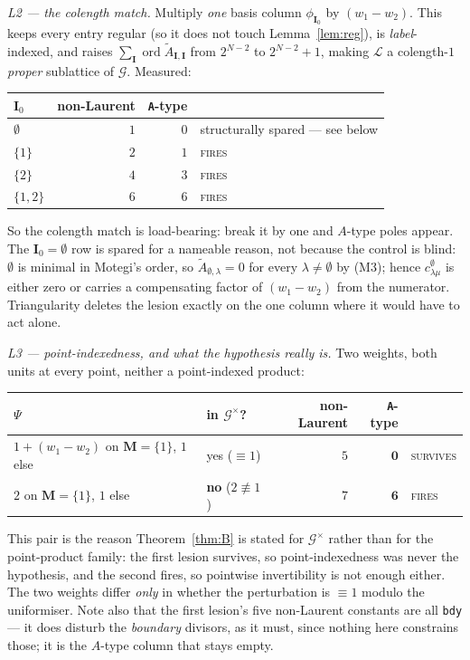 \documentclass[11pt]{article}
\theoremstyle{plain}
\theoremstyle{definition}
\theoremstyle{remark}
\theoremstyle{plain}
\newcommand{\bI}{\mathbf{I}}
\newcommand{\bM}{\mathbf{M}}
\newcommand{\At}{\widetilde{A}}
\newcommand{\ord}{\operatorname{ord}}
\newcommand{\Lat}{\mathcal{L}}
\newcommand{\Gkm}{\mathcal{G}}
\begin{document}
\emph{L2 --- the colength match.}  Multiply \emph{one} basis column $\phi_{\bI_0}$
by $(w_1-w_2)$.  This keeps every entry regular (so it does not touch
Lemma~\ref{lem:reg}), is \emph{label}-indexed, and raises
$\sum_\bI\ord\At_{\bI,\bI}$ from $2^{N-2}$ to $2^{N-2}+1$, making $\Lat$ a
colength-$1$ \emph{proper} sublattice of $\Gkm$.  Measured:
\begin{center}\small
\begin{tabular}{lrrl}
\toprule
$\bI_0$ & non-Laurent & \texttt{A}-type & \\\midrule
$\emptyset$ & $1$ & $0$ & structurally spared --- see below \\
$\{1\}$     & $2$ & $1$ & \textsc{fires} \\
$\{2\}$     & $4$ & $3$ & \textsc{fires} \\
$\{1,2\}$   & $6$ & $6$ & \textsc{fires} \\
\bottomrule
\end{tabular}
\end{center}
So the colength match is load-bearing: break it by one and $A$-type poles appear.
The $\bI_0=\emptyset$ row is spared for a nameable reason, not because the control
is blind: $\emptyset$ is minimal in Motegi's order, so $\At_{\emptyset,\lambda}=0$
for every $\lambda\neq\emptyset$ by (M3); hence $c^{\emptyset}_{\lambda\mu}$ is
either zero or carries a compensating factor of $(w_1-w_2)$ from the numerator.
Triangularity deletes the lesion exactly on the one column where it would have to
act alone.

\emph{L3 --- point-indexedness, and what the hypothesis really is.}  Two weights,
both units at every point, neither a point-indexed product:
\begin{center}\small
\begin{tabular}{llrrl}
\toprule
$\Psi$ & in $\Gkm^{\times}$? & non-Laurent & \texttt{A}-type & \\\midrule
$1+(w_1-w_2)$ on $\bM=\{1\}$, $1$ else & yes ($\equiv1$) & $5$ & $\mathbf{0}$ & \textsc{survives} \\
$2$ on $\bM=\{1\}$, $1$ else            & \textbf{no} ($2\not\equiv1$) & $7$ & $\mathbf{6}$ & \textsc{fires} \\
\bottomrule
\end{tabular}
\end{center}
This pair is the reason Theorem~\ref{thm:B} is stated for $\Gkm^{\times}$ rather
than for the point-product family: the first lesion survives, so point-indexedness
was never the hypothesis, and the second fires, so pointwise invertibility is not
enough either.  The two weights differ \emph{only} in whether the perturbation is
$\equiv1$ modulo the uniformiser.  Note also that the first lesion's five
non-Laurent constants are all \texttt{bdy} --- it does disturb the
\emph{boundary} divisors, as it must, since nothing here constrains those; it is
the $A$-type column that stays empty.
\end{document}
